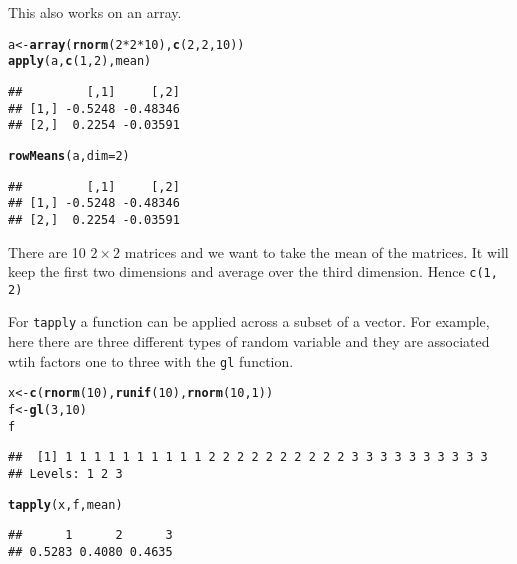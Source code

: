 \documentclass[12pt, a4paper, oneside]{article}\usepackage[]{graphicx}\usepackage[]{color}
\makeatletter
\newcommand{\hlnum}[1]{\textcolor[rgb]{0.686,0.059,0.569}{#1}}%
\newcommand{\hlopt}[1]{\textcolor[rgb]{0,0,0}{#1}}%
\newcommand{\hlstd}[1]{\textcolor[rgb]{0.345,0.345,0.345}{#1}}%
\newcommand{\hlkwb}[1]{\textcolor[rgb]{0.69,0.353,0.396}{#1}}%
\newcommand{\hlkwc}[1]{\textcolor[rgb]{0.333,0.667,0.333}{#1}}%
\newcommand{\hlkwd}[1]{\textcolor[rgb]{0.737,0.353,0.396}{\textbf{#1}}}%
\newenvironment{kframe}{%
 \def\at@end@of@kframe{}%
 \ifinner\ifhmode%
  \def\at@end@of@kframe{\end{minipage}}%
  \begin{minipage}{\columnwidth}%
 \fi\fi%
 \def\FrameCommand##1{\hskip\@totalleftmargin \hskip-\fboxsep
 \colorbox{shadecolor}{##1}\hskip-\fboxsep
     \hskip-\linewidth \hskip-\@totalleftmargin \hskip\columnwidth}%
 \MakeFramed {\advance\hsize-\width
   \@totalleftmargin\z@ \linewidth\hsize
   \@setminipage}}%
 {\par\unskip\endMakeFramed%
 \at@end@of@kframe}
\newenvironment{knitrout}{}{} %
\makeatother
\begin{document}
This also works on an array. 

\begin{knitrout}
\color{fgcolor}\begin{kframe}
\begin{alltt}
\hlstd{a} \hlkwb{<-} \hlkwd{array}\hlstd{(}\hlkwd{rnorm}\hlstd{(}\hlnum{2} \hlopt{*} \hlnum{2} \hlopt{*} \hlnum{10}\hlstd{),} \hlkwd{c}\hlstd{(}\hlnum{2}\hlstd{,} \hlnum{2}\hlstd{,} \hlnum{10}\hlstd{))}
\hlkwd{apply}\hlstd{(a,} \hlkwd{c}\hlstd{(}\hlnum{1}\hlstd{,} \hlnum{2}\hlstd{), mean)}
\end{alltt}
\begin{verbatim}
##         [,1]     [,2]
## [1,] -0.5248 -0.48346
## [2,]  0.2254 -0.03591
\end{verbatim}
\begin{alltt}
\hlkwd{rowMeans}\hlstd{(a,} \hlkwc{dim} \hlstd{=} \hlnum{2}\hlstd{)}
\end{alltt}
\begin{verbatim}
##         [,1]     [,2]
## [1,] -0.5248 -0.48346
## [2,]  0.2254 -0.03591
\end{verbatim}
\end{kframe}
\end{knitrout}

There are 10 $2 \times 2$ matrices and we want to take the mean of the matrices.  It will keep the first two dimensions and average over the third dimension.  Hence \lstinline{c(1, 2)}

For \lstinline{tapply} a function can be applied across a subset of a vector.  For example, here there are three different types of random variable and they are associated wtih factors one to three with the \lstinline{gl} function. 

\begin{knitrout}
\color{fgcolor}\begin{kframe}
\begin{alltt}
\hlstd{x} \hlkwb{<-} \hlkwd{c}\hlstd{(}\hlkwd{rnorm}\hlstd{(}\hlnum{10}\hlstd{),} \hlkwd{runif}\hlstd{(}\hlnum{10}\hlstd{),} \hlkwd{rnorm}\hlstd{(}\hlnum{10}\hlstd{,} \hlnum{1}\hlstd{))}
\hlstd{f} \hlkwb{<-} \hlkwd{gl}\hlstd{(}\hlnum{3}\hlstd{,} \hlnum{10}\hlstd{)}
\hlstd{f}
\end{alltt}
\begin{verbatim}
##  [1] 1 1 1 1 1 1 1 1 1 1 2 2 2 2 2 2 2 2 2 2 3 3 3 3 3 3 3 3 3 3
## Levels: 1 2 3
\end{verbatim}
\begin{alltt}
\hlkwd{tapply}\hlstd{(x, f, mean)}
\end{alltt}
\begin{verbatim}
##      1      2      3 
## 0.5283 0.4080 0.4635
\end{verbatim}
\end{kframe}
\end{knitrout}
\end{document}
